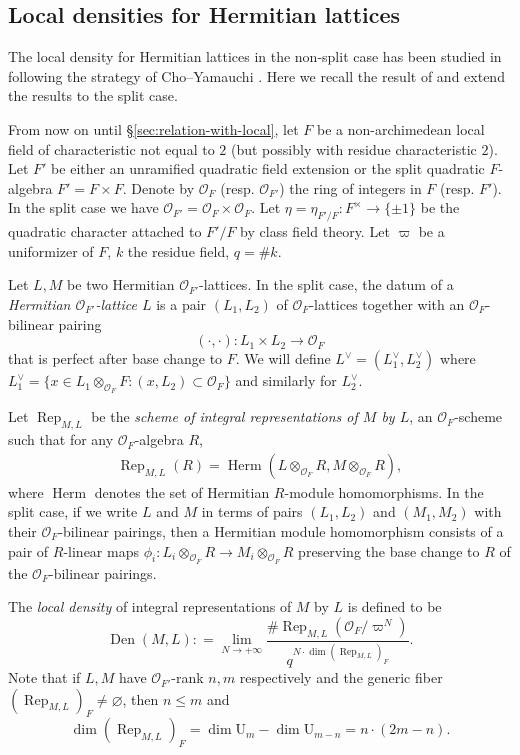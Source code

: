 \documentclass[reqno]{amsart}
\numberwithin{equation}{section}
\newcommand{\U}{\mathrm{U}}
\DeclareMathOperator{\Rep}{Rep}
\DeclareMathOperator{\Herm}{Herm}
\DeclareMathOperator{\Den}{Den}
\newcommand\cO{\mathcal{O}}
\theoremstyle{remark}
\numberwithin{equation}{section}
\begin{document}
\subsection{Local densities for Hermitian lattices}\label{ss:loc den}
The local density for Hermitian lattices in the non-split case has been studied in \cite[\S3]{LZ1} following the strategy of Cho--Yamauchi \cite{CY}. Here we recall the result of \cite{LZ1} and extend the results to the split case.
 
From now on until \S\ref{sec:relation-with-local}, let $F$ be a non-archimedean local field of characteristic not equal to $2$ (but possibly with residue characteristic $2$). Let $F'$ be either an unramified quadratic field extension or  the split quadratic $F$-algebra $F'=F\times F$. Denote by $\cO_F$ (resp. $\cO_{F'}$) the ring of integers in $F$ (resp. $F'$). In the split case we have $\cO_{F'}=\cO_F\times \cO_F$.  Let $\eta=\eta_{F'/F}: F^\times\to\{\pm1\}$ be the quadratic character attached to $F'/F$ by class field theory. Let $\varpi$ be a uniformizer of $F$, $k$ the residue field, $q=\#k$. 

Let $L, M$ be two Hermitian $\cO_{F'}$-lattices. In the split case,  the datum of a \emph{Hermitian $\cO_{F'}$-lattice $L$} is a pair $(L_1,L_2)$ of $\cO_{F}$-lattices together with an $\cO_{F}$-bilinear pairing
\begin{equation*}
(\cdot,\cdot): L_{1}\times L_{2} \to \cO_{F}
\end{equation*}
that is perfect after base change to $F$.  We will define $L^\vee=(L_1^\vee, L_2^\vee)$ where $L_1^\vee= \{x\in L_{1}\otimes_{\cO_F} F: (x,L_2)\subset \cO_F  \}$ and similarly for $L_2^\vee$. 


Let $\Rep_{M,L}$ be the \emph{scheme of integral representations of $M$ by $L$}, an $\cO_F$-scheme such that for any $\cO_F$-algebra $R$, 
\begin{align*}\label{def: Rep}
\Rep_{M,L}(R)=\Herm(L \otimes_{\cO_F}R, M \otimes_{\cO_F}R),
\end{align*} 
where $\Herm$ denotes the set of Hermitian $R$-module homomorphisms. In the split case, if we write $L$ and $M$ in terms of pairs $(L_1,L_2)$ and $(M_1,M_2)$ with their $\cO_{F}$-bilinear pairings, then a  Hermitian module homomorphism consists of a pair of $R$-linear maps $\phi_i:L_i \otimes_{\cO_F}R\to M_i \otimes_{\cO_F}R $ preserving the base change to $R$ of the $\cO_{F}$-bilinear pairings.

The \emph{local density} of integral representations of $M$ by $L$ is defined to be $$\Den(M,L)\colon= \lim_{N\rightarrow +\infty}\frac{\#\Rep_{M,L}(\cO_F/\varpi^N)}{q^{N\cdot\dim (\Rep_{M,L})_{F}}}.$$ Note that if $L, M$ have $\cO_{F'}$-rank $n, m$ respectively and the generic fiber $(\Rep_{M,L})_{F}\ne\varnothing$, then $n\le m$ and
\begin{equation*}
\dim (\Rep_{M,L})_{F}=\dim \U_m-\dim \U_{m-n}= n\cdot (2m-n).  
\end{equation*}
\end{document}
